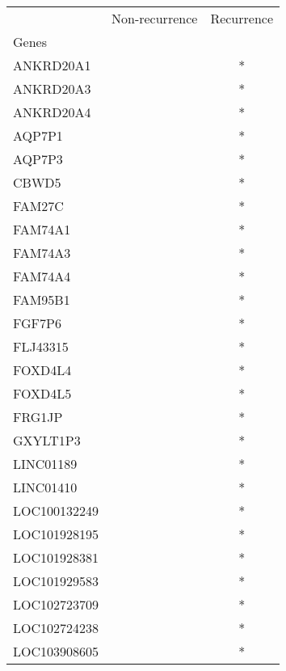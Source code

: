 \begin{tabular}{lcc}
\toprule
{} & Non-recurrence & Recurrence \\
Genes              &                &            \\
\midrule
ANKRD20A1          &                &          * \\
ANKRD20A3          &                &          * \\
ANKRD20A4          &                &          * \\
AQP7P1             &                &          * \\
AQP7P3             &                &          * \\
CBWD5              &                &          * \\
FAM27C             &                &          * \\
FAM74A1            &                &          * \\
FAM74A3            &                &          * \\
FAM74A4            &                &          * \\
FAM95B1            &                &          * \\
FGF7P6             &                &          * \\
FLJ43315           &                &          * \\
FOXD4L4            &                &          * \\
FOXD4L5            &                &          * \\
FRG1JP             &                &          * \\
GXYLT1P3           &                &          * \\
LINC01189          &                &          * \\
LINC01410          &                &          * \\
LOC100132249       &                &          * \\
LOC101928195       &                &          * \\
LOC101928381       &                &          * \\
LOC101929583       &                &          * \\
LOC102723709       &                &          * \\
LOC102724238       &                &          * \\
LOC103908605       &                &          * \\

\end{tabular}
